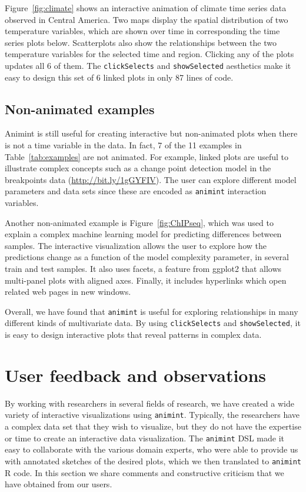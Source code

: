 \documentclass[12pt]{article}\usepackage[]{graphicx}\usepackage[]{color}
\begin{document}
Figure~\ref{fig:climate} shows an interactive animation of climate
time series data observed in Central America. Two maps display the
spatial distribution of two temperature variables, which are shown
over time in corresponding the time series plots below. Scatterplots
also show the relationships between the two temperature variables for
the selected time and region. Clicking any of the plots updates all 6
of them. The \texttt{clickSelects} and \texttt{showSelected} aesthetics make it easy to
design this set of 6 linked plots in only 87 lines of code.

\subsection{Non-animated examples}

Animint is still useful for creating interactive but
non-animated plots when there is not a time variable in the data. 
In fact, 7 of the 11 examples in
Table~\ref{tab:examples} are not animated. For example, linked plots
are useful to illustrate complex concepts such as a change point
detection model in the breakpoints data
(\url{http://bit.ly/1gGYFIV}). The user can explore different model
parameters and data sets since these are encoded as \texttt{animint}
interaction variables.

Another non-animated example is Figure~\ref{fig:ChIPseq}, which was
used to explain a complex machine learning model for predicting
differences between samples. The interactive visualization allows the
user to explore how the predictions change as a function of the model
complexity parameter, in several train and test samples. It also uses
facets, a feature from ggplot2 that allows multi-panel plots with
aligned axes. Finally, it includes hyperlinks which open related web
pages in new windows.

Overall, we have found that \texttt{animint} is useful for exploring
relationships in many different kinds of multivariate data. By using
\texttt{clickSelects} and \texttt{showSelected}, it is easy to design
interactive plots that reveal patterns in complex data.

\section{User feedback and observations}

By working with researchers in several fields of research,
we have created a wide variety of
interactive visualizations using \texttt{animint}.
Typically, the researchers have a complex data set that
they wish to visualize,
but they do not have the expertise or time to create
an interactive data visualization.
The \texttt{animint} DSL made it easy to collaborate with the various domain experts,
who were able to provide us with annotated sketches of the desired plots,
which we then translated to \texttt{animint} R code.
In this section we share comments and
constructive criticism that we have obtained from our users.
\end{document}
